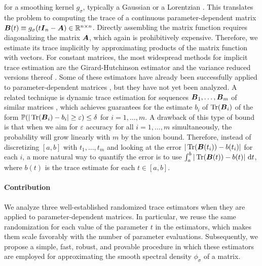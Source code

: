 \documentclass[12pt]{article}
\begin{document}
for a smoothing kernel $g_{\sigma}$, typically a Gaussian \cite{lin-2016-approximating-spectral, lin-2017-randomized-estimation} or a Lorentzian \cite{haydock-1972-electronic-structure, lin-2016-approximating-spectral}. This translates the problem to computing the trace of a continuous parameter-dependent matrix $\boldsymbol{B}(t) \equiv g_{\sigma}(t \boldsymbol{I}_n - \boldsymbol{A}) \in \mathbb{R}^{n \times n}$. Directly assembling the matrix function requires diagonalizing the matrix $\boldsymbol{A}$, which again is prohibitively expensive. Therefore, we estimate its trace implicitly by approximating products of the matrix function with vectors. For constant matrices, the most widespread methods for implicit trace estimation are the Girard-Hutchinson estimator \cite{girard-1989-fast-montecarlo, hutchinson-1990-stochastic-estimator} and the variance reduced versions thereof \cite{gambhir-2017-deflation-method, saibaba-2017-randomized-matrixfree, lin-2017-randomized-estimation, meyer-2021-hutch-optimal, persson-2022-improved-variants, epperly-2024-xtrace-making, chen-2023-krylovaware-stochastic}. Some of these estimators have already been successfully applied to parameter-dependent matrices \cite{lin-2017-randomized-estimation}, but they have not yet been analyzed. A related technique is dynamic trace estimation for sequences $\boldsymbol{B}_1, \dots, \boldsymbol{B}_m$ of similar matrices \cite{woodruff-2022-optimal-query, dharangutte-2021-dynamic-trace}, which achieves guarantees for the estimate $b_i$ of $\operatorname{Tr}(\boldsymbol{B}_i)$ of the form $\mathbb{P}(|\operatorname{Tr}(\boldsymbol{B}_i) - b_i| \geq \varepsilon) \leq \delta$ for $i=1,\dots, m$. A drawback of this type of bound is that when we aim for $\varepsilon$ accuracy for all $i=1,\dots, m$ simultaneously, the probability will grow linearly with $m$ by the union bound. Therefore, instead of discretizing $[a, b]$ with $t_1, \ldots, t_m$ and looking at the error $|\operatorname{Tr}(\boldsymbol{B}(t_i)) - b(t_i)|$ for each $i$, a more natural way to quantify the error is to use $\int_{a}^{b} | \operatorname{Tr}(\boldsymbol{B}(t)) - b(t) |~\mathrm{d}t$, where $b(t)$ is the trace estimate for each $t \in [a, b]$.

\paragraph{Contribution}
We analyze three well-established randomized trace estimators when they are applied to parameter-dependent matrices. In particular, we reuse the same randomization for each value of the parameter $t$ in the estimators, which makes them scale favorably with the number of parameter evaluations. Subsequently, we propose a simple, fast, robust, and provable procedure in which these estimators are employed for approximating the smooth spectral density $\phi_{\sigma}$ of a matrix.
\end{document}
